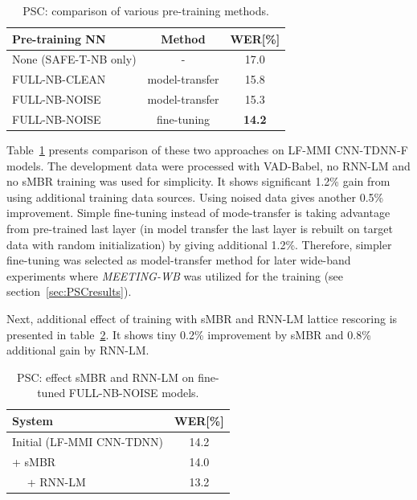 \documentclass{article}
\begin{document}
\begin{table}[tb]
\caption{PSC: comparison of various pre-training methods.}
\vspace{2mm}
\label{tab:psc:am-pretraining}
\begin{center}
\begin{tabular}{lcc}
\hline 
Pre-training NN & Method & WER[\%] \\
\hline
None (SAFE-T-NB only) & - &  17.0 \\ 
 FULL-NB-CLEAN & model-transfer & 15.8  \\
 FULL-NB-NOISE & model-transfer & 15.3  \\
 FULL-NB-NOISE & fine-tuning    & {\bf 14.2}  \\
\hline
\end{tabular}
\end{center}
\end{table}




Table~\ref{tab:psc:am-pretraining} presents comparison of these two
approaches on LF-MMI CNN-TDNN-F models. The development data were
processed with VAD-Babel, no RNN-LM and no sMBR training was used for
simplicity. It shows significant 1.2\% gain from using additional
training data sources. Using noised data gives another 0.5\%
improvement. Simple fine-tuning instead of mode-transfer is taking
advantage from pre-trained last layer (in model transfer the last
layer is rebuilt on target data with random initialization) by giving
additional 1.2\%. 
Therefore, simpler fine-tuning was selected as model-transfer method for later wide-band experiments where {\it MEETING-WB} was utilized for the training 
(see section~\ref{sec:PSCresults}). 


Next, additional effect of training with sMBR and RNN-LM lattice rescoring is presented
in table~\ref{tab:psc:sMBR_RNNLM}. It shows  
tiny 0.2\% improvement by sMBR and 0.8\% additional gain by RNN-LM.



\begin{table}[ht]
\caption{PSC: effect sMBR and RNN-LM on fine-tuned FULL-NB-NOISE models.}
\label{tab:psc:sMBR_RNNLM}
\begin{center}
\begin{tabular}{lc}
\hline 
System & WER[\%] \\
\hline
Initial (LF-MMI CNN-TDNN) & 14.2  \\ 
  + sMBR       &   14.0 \\
 ~~ + RNN-LM   & 13.2  \\
\hline
\end{tabular}
\end{center}
\end{table}
\end{document}
